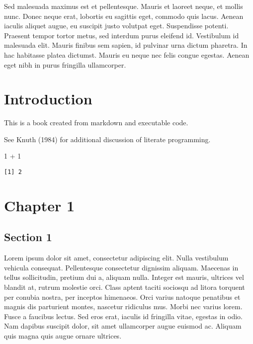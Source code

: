 \documentclass[
  12pt,
  letterpaper,
  oneside,
  open=any]{scrbook}
\newenvironment{Shaded}{\begin{snugshade}}{\end{snugshade}}
\newcommand{\DecValTok}[1]{\textcolor[rgb]{0.68,0.00,0.00}{#1}}
\newcommand{\SpecialCharTok}[1]{\textcolor[rgb]{0.37,0.37,0.37}{#1}}
\begin{document}
Sed malesuada maximus est et pellentesque. Mauris et laoreet neque, et
mollis nunc. Donec neque erat, lobortis eu sagittis eget, commodo quis
lacus. Aenean iaculis aliquet augue, eu suscipit justo volutpat eget.
Suspendisse potenti. Praesent tempor tortor metus, sed interdum purus
eleifend id. Vestibulum id malesuada elit. Mauris finibus sem sapien, id
pulvinar urna dictum pharetra. In hac habitasse platea dictumst. Mauris
eu neque nec felis congue egestas. Aenean eget nibh in purus fringilla
ullamcorper.

\listoftables
\listoffigures
\tableofcontents


\hypertarget{introduction}{%
\chapter*{Introduction}\label{introduction}}




This is a book created from markdown and executable code.

See Knuth (1984) for additional discussion of literate programming.

\begin{Shaded}
\begin{Highlighting}[]
\DecValTok{1} \SpecialCharTok{+} \DecValTok{1}
\end{Highlighting}
\end{Shaded}

\begin{verbatim}
[1] 2
\end{verbatim}


\hypertarget{chapter-1}{%
\chapter{Chapter 1}\label{chapter-1}}

\hypertarget{section-1}{%
\section{Section 1}\label{section-1}}

Lorem ipsum dolor sit amet, consectetur adipiscing elit. Nulla
vestibulum vehicula consequat. Pellentesque consectetur dignissim
aliquam. Maecenas in tellus sollicitudin, pretium dui a, aliquam nulla.
Integer est mauris, ultrices vel blandit at, rutrum molestie orci. Class
aptent taciti sociosqu ad litora torquent per conubia nostra, per
inceptos himenaeos. Orci varius natoque penatibus et magnis dis
parturient montes, nascetur ridiculus mus. Morbi nec varius lorem. Fusce
a faucibus lectus. Sed eros erat, iaculis id fringilla vitae, egestas in
odio. Nam dapibus suscipit dolor, sit amet ullamcorper augue euismod ac.
Aliquam quis magna quis augue ornare ultrices.
\end{document}
